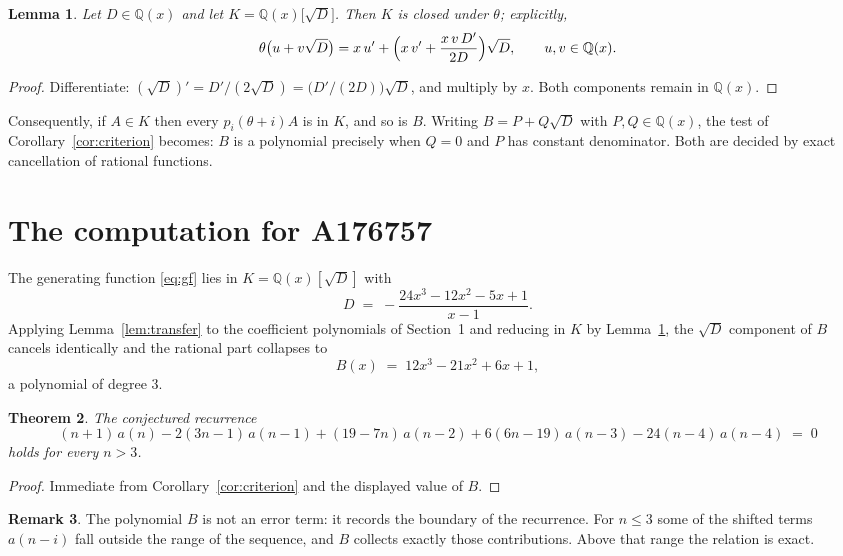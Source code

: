 \documentclass[11pt,a4paper]{article}
\theoremstyle{plain}
\newtheorem{theorem}{Theorem}
\newtheorem{lemma}[theorem]{Lemma}
\theoremstyle{definition}
\newtheorem{remark}[theorem]{Remark}
\begin{document}
\begin{lemma}\label{lem:field}
Let $D\in\mathbb{Q}(x)$ and let $K=\mathbb{Q}(x)\bigl[\sqrt{D}\bigr]$. Then $K$ is closed
under $\theta$; explicitly,
\[
\theta\bigl(u+v\sqrt{D}\bigr)=x\,u'+\Bigl(x\,v'+\frac{x\,v\,D'}{2D}\Bigr)\sqrt{D},
\qquad u,v\in\mathbb{Q}(x).
\]
\end{lemma}

\begin{proof}
Differentiate: $(\sqrt{D})'=D'/(2\sqrt{D})=\bigl(D'/(2D)\bigr)\sqrt{D}$, and multiply by
$x$. Both components remain in $\mathbb{Q}(x)$.
\end{proof}

Consequently, if $A\in K$ then every $p_{i}(\theta+i)A$ is in $K$, and so is $B$. Writing
$B=P+Q\sqrt{D}$ with $P,Q\in\mathbb{Q}(x)$, the test of Corollary~\ref{cor:criterion}
becomes: $B$ is a polynomial precisely when $Q=0$ and $P$ has constant denominator. Both
are decided by exact cancellation of rational functions.

\section{The computation for A176757}

The generating function \eqref{eq:gf} lies in $K=\mathbb{Q}(x)[\sqrt{D}]$ with
\[
D \;=\; - \frac{24 x^{3} - 12 x^{2} - 5 x + 1}{x - 1} .
\]
Applying Lemma~\ref{lem:transfer} to the coefficient polynomials of Section~1 and reducing
in $K$ by Lemma~\ref{lem:field}, the $\sqrt{D}$ component of $B$ cancels identically and
the rational part collapses to
\[
B(x)\;=\;12 x^{3} - 21 x^{2} + 6 x + 1 ,
\]
a polynomial of degree $3$.

\begin{theorem}
The conjectured recurrence
\[
(n + 1)\,a(n) -  2 \left(3 n - 1\right)\,a(n-1) + (19 - 7 n)\,a(n-2) + 6 \left(6 n - 19\right)\,a(n-3) -  24 \left(n - 4\right)\,a(n-4) \;=\;0
\]
holds for every $n>3$.
\end{theorem}

\begin{proof}
Immediate from Corollary~\ref{cor:criterion} and the displayed value of $B$.
\end{proof}

\begin{remark}
The polynomial $B$ is not an error term: it records the boundary of the recurrence. For
$n\le3$ some of the shifted terms $a(n-i)$ fall outside the range of the sequence,
and $B$ collects exactly those contributions. Above that range the relation is exact.
\end{remark}
\end{document}
